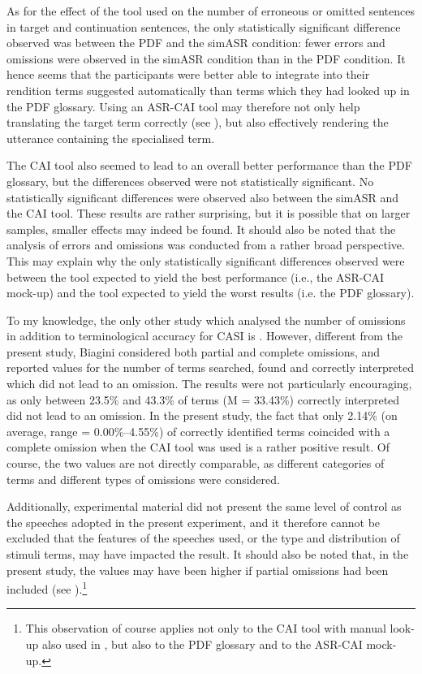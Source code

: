 As for the effect of the tool used on the number of erroneous or omitted sentences in target and continuation sentences, the only statistically significant difference observed was between the PDF and the simASR condition: fewer errors and omissions were observed in the simASR condition than in the PDF condition. It hence seems that the participants were better able to integrate into their rendition terms suggested automatically than terms which they had looked up in the PDF glossary. Using an ASR-CAI tool may therefore not only help translating the target term correctly (see ), but also effectively rendering the utterance containing the specialised term.

The CAI tool also seemed to lead to an overall better performance than the PDF glossary, but the differences observed were not statistically significant. No statistically significant differences were observed also between the simASR and the CAI tool. These results are rather surprising, but it is possible that on larger samples, smaller effects may indeed be found. It should also be noted that the analysis of errors and omissions was conducted from a rather broad perspective. This may explain why the only statistically significant differences observed were between the tool expected to yield the best performance (i.e., the ASR-CAI mock-up) and the tool expected to yield the worst results (i.e. the PDF glossary).

To my knowledge, the only other study which analysed the number of omissions in addition to terminological accuracy for CASI is \citet{biagini_glossario_2015}. However, different from the present study, Biagini considered both partial and complete omissions, and reported values for the number of terms searched, found and correctly interpreted which did not lead to an omission. The results were not particularly encouraging, as only between 23.5\% and 43.3\% of terms (M = 33.43\%) correctly interpreted did not lead to an omission. In the present study, the fact that only 2.14\% (on average, range = 0.00\%–4.55\%) of correctly identified terms coincided with a complete omission when the CAI tool was used is a rather positive result. Of course, the two values are not directly comparable, as different categories of terms and different types of omissions were considered.

Additionally,  experimental material did not present the same level of control as the speeches adopted in the present experiment, and it therefore cannot be excluded that the features of the speeches used, or the type and distribution of stimuli terms, may have impacted the result. It should also be noted that, in the present study, the values may have been higher if partial omissions had been included (see ).\footnote{This observation of course applies not only to the CAI tool with manual look-up also used in \citet{biagini_glossario_2015}, but also to the PDF glossary and to the ASR-CAI mock-up.}

